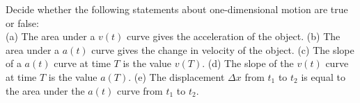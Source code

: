 Decide whether the following statements about
one-dimensional motion are true or false:\\
%
(a) The area under a $v(t)$ curve gives the acceleration of the
object.\hwendpart
%
(b) The area under a $a(t)$ curve gives the change in velocity of the
object.\hwendpart
%
(c) The slope of a $a(t)$ curve at time $T$ is the value
$v(T)$.\hwendpart
%
(d) The slope of the $v(t)$ curve at time $T$ is the value
$a(T)$.\hwendpart
%
(e) The displacement $\Delta x$ from $t_1$ to $t_2$ is equal to the
area under the $a(t)$ curve from $t_1$ to $t_2$.
